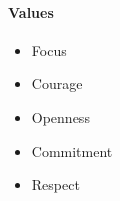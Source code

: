 \documentclass[letterpaper,10pt,english]{jupyterBook}
\begin{document}
\paragraph{Values}
\label{\detokenize{APM/agile:values}}\begin{itemize}
\item {} 
\sphinxAtStartPar
Focus

\item {} 
\sphinxAtStartPar
Courage

\item {} 
\sphinxAtStartPar
Openness

\item {} 
\sphinxAtStartPar
Commitment

\item {} 
\sphinxAtStartPar
Respect

\end{itemize}
\end{document}
